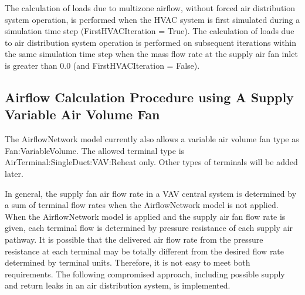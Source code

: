 The calculation of loads due to multizone airflow, without forced air distribution system operation, is performed when the HVAC system is first simulated during a simulation time step (FirstHVACIteration = True). The calculation of loads due to air distribution system operation is performed on subsequent iterations within the same simulation time step when the mass flow rate at the supply air fan inlet is greater than 0.0 (and FirstHVACIteration = False).

\subsection{Airflow Calculation Procedure using A Supply Variable Air Volume Fan}\label{airflow-calculation-procedure-using-a-supply-variable-air-volume-fan}

The AirflowNetwork model currently also allows a variable air volume fan type as Fan:VariableVolume. The allowed terminal type is AirTerminal:SingleDuct:VAV:Reheat only. Other types of terminals will be added later.

In general, the supply fan air flow rate in a VAV central system is determined by a sum of terminal flow rates when the AirflowNetwork model is not applied. When the AirflowNetwork model is applied and the supply air fan flow rate is given, each terminal flow is determined by pressure resistance of each supply air pathway. It is possible that the delivered air flow rate from the pressure resistance at each terminal may be totally different from the desired flow rate determined by terminal units. Therefore, it is not easy to meet both requirements. The following compromised approach, including possible supply and return leaks in an air distribution system, is implemented.

